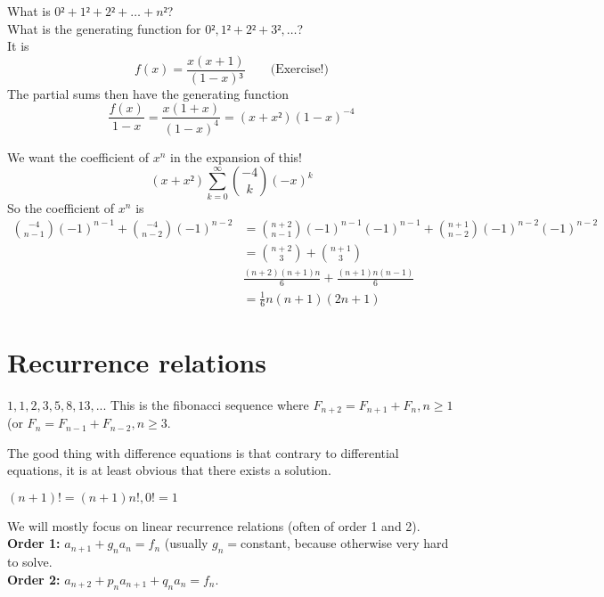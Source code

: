 \documentclass[english]{lbscript}
\begin{document}
\begin{example}{}{}
  What is \(0²+1²+2²+\dots+n²\)?\\
  What is the generating function for \(0²,1²+2²+3²,\dots\)?\\
  It is
\begin{equation}
\label{eq:55}
f(x)= \frac{x(x+1)}{(1-x)³}\quad \quad \text{(Exercise!)}
\end{equation}
The partial sums then have the generating function
\begin{equation}
\label{eq:56}
\frac{f(x)}{1-x} = \frac{x(1+x)}{(1-x)^{4}} = (x+x²)(1-x)^{-4}
\end{equation}

We want the coefficient of \(x^{n}\) in the expansion of this!\\
\begin{equation}
\label{eq:57}
(x+x²) ∑_{k=0}^{∞} \binom{-4}{k} (-x)^{k}
\end{equation}
So the coefficient of \(x^{n}\) is
\begin{align}
\label{eq:58}
  \binom{-4}{n-1} (-1)^{n-1} + \binom{-4}{n-2} (-1)^{n-2}
  &= \binom{n+2}{n-1} (-1)^{n-1}(-1)^{n-1} + \binom{n+1}{n-2} (-1)^{n-2} (-1)^{n-2}\\
  &= \binom{n+2}{3} + \binom{n+1}{3}\\
  &\frac{(n+2)(n+1)n}{6} + \frac{(n+1)n(n-1)}{6} \\
  &= \frac{1}{6} n(n+1)(2n+1)
\end{align}
\end{example}


\section{Recurrence relations}

\begin{example}{}{}
  \(1,1,2,3,5,8,13,...\) This is the fibonacci sequence where \(F_{n+2}=F_{n+1}+F_{n}, n≥1\) (or \(F_n=F_{n-1}+F_{n-2}, n≥3\).
\end{example}
The good thing with difference equations is that contrary to differential equations, it is at least obvious that there exists a solution.


\begin{example}{}{}
\((n+1)! = (n+1)n!, 0!=1\)
\end{example}

We will mostly focus on linear recurrence relations (often of order 1 and 2).\\
\textbf{Order 1:} \(a_{n+1} + g_n a_n = f_n\) (usually \(g_n=\)constant, because otherwise very hard to solve.\\
\textbf{Order 2:} \(a_{n+2} + p_n a_{n+1} + q_n a_n=f_n\).
\end{document}
